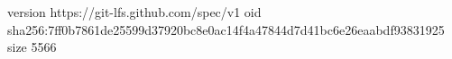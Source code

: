 version https://git-lfs.github.com/spec/v1
oid sha256:7ff0b7861de25599d37920bc8e0ac14f4a47844d7d41bc6e26eaabdf93831925
size 5566
